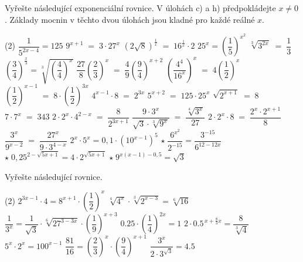 \documentclass[12pt,a4paper]{article}
\begin{document}
\begin{exercise}
Vyřešte následující exponenciální rovnice.
V úlohách c) a h) předpokládejte $x\neq0$.
Základy mocnin v těchto dvou úlohách jsou kladné pro každé reálné $x$.

\begin{tasks}(2)
    \task $\dfrac{1}{5^{2x-4}}=125$
    \task $9^{x+1} \;=\; 3 \cdot 27^{x}$
    \task $\left(2\sqrt{8}\right)^{\frac1x} \;=\; 16^{\frac1x}\cdot 2$
    \task $25^x = \left(\dfrac{1}{5}\right)^{x^2}$
    \task $\sqrt[3]{3^{2x}} \;=\; \dfrac{1}{3}$
    \task $\left(\dfrac{3}{4}\right)^{\frac{x}{3}} = \sqrt[3]{\left(\dfrac{4}{4}\right)^{x}}$
    \task $\dfrac{27}{8}\left(\dfrac{2}{3}\right)^{x} \;=\; \dfrac{4}{9}\left(\dfrac{9}{4}\right)^{x+2}$
    \task $\left(\dfrac{4^{4}}{16^{x}}\right)^x \;=\; 4\left(\dfrac{1}{2}\right)^{x}$
    \task $\left(\dfrac{1}{2}\right)^{x-1} \;=\; 8 \cdot \left(\dfrac{1}{2}\right)^{3x}$
    \task $4^{x-1} \cdot 8 \;=\; 2^{3x}$
    \task $5^{x+2} \;=\; 125 \cdot 25^{x}$
    \task $\sqrt{2^{x+1}} \;=\; 8$
    \task $7 \cdot 7^{x} \;=\; 343$
    \task $2 \cdot 2^x \cdot 4^{2-x} \;=\; \dfrac{8}{2^{3x+1}}$
    \task $\dfrac{9 \cdot 3^x}{\sqrt{3}\cdot \sqrt[3]{9^x}} \;=\; \dfrac{\sqrt[4]{3^x}}{27}$
    \task $2 \cdot 2^x \cdot 8 \;=\; \dfrac{2^x \cdot 2^{x+1}}{8}$
    \task $\dfrac{3^x}{9^{x-2}} \;=\; \dfrac{27^{x}}{9 \cdot 3^{4-x}}$
    \task $2^x \cdot 5^x = 0,1 \cdot \left(10^{x-1}\right)^5$
    \task $\star \; \dfrac{6^{x^2}}{2^{-15}} = \dfrac{3^{-15}}{6^{12-12x}}$
    \task $\star \; 0,25^{2-\sqrt{5x+1}} = 4 \cdot 2^{\sqrt{5x+1}}$
    \task $\star \; 9^{x(x-1) - 0,5} = \sqrt{3}$
\end{tasks}
\end{exercise}


\newpage
\begin{exercise}
Vyřešte následující rovnice.

\begin{tasks}(2)
\task $2^{3x-1} \cdot 4 = 8^{x+1} \cdot \left(\dfrac{1}{2}\right)^{x}$
\task $\sqrt[4]{4^{x}} \cdot \sqrt[3]{2^{x-3}} = \sqrt[6]{16}$
\task $\dfrac{1}{3^{x}}
      = \dfrac{1}{\sqrt{3}} \cdot \sqrt[6]{27^{3 - 3x}} \cdot \left(\dfrac{1}{9}\right)^{x+3}$
\task $0.25 \cdot \left(\dfrac{1}{4}\right)^{2x} = 1$
\task $2 \cdot 0.5^{\,x + \tfrac{8}{3}x} = \dfrac{8}{\sqrt[3]{4}}$
\task $5^{x} \cdot 2^{x} = 100^{x-1}$
\task $\dfrac{81}{16}
      = \left(\dfrac{2}{3}\right)^{x} \cdot \left(\dfrac{9}{4}\right)^{x+1}$
\task $\dfrac{3^{x}}{2 \cdot 3^{\sqrt{3}}} = 4.5$

\end{tasks}

\end{exercise}
\end{document}
